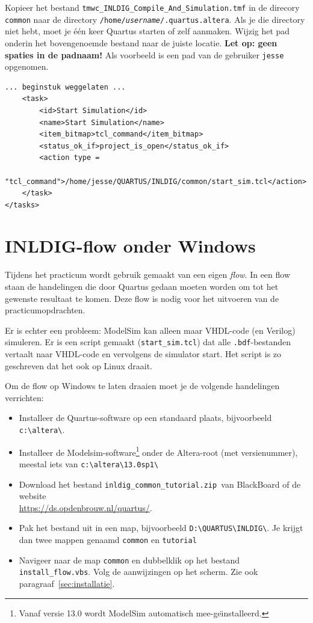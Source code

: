 \documentclass[a4paper,12pt,fleqn,twoside]{book}
\newcommand{\naam}[1]{\texttt{#1}}
\begin{document}
Kopieer het bestand \lstinline|tmwc_INLDIG_Compile_And_Simulation.tmf| in de
direcory \naam{common} naar de directory
\naam{/home/\textsl{username}/.quartus.altera}.
Als je die directory niet hebt, moet je \'{e}\'{e}n keer Quartus starten of
zelf aanmaken. Wijzig het pad onderin het bovengenoemde bestand naar de
juiste locatie. \textbf{Let op: geen spaties in de padnaam!} Als
voorbeeld is een pad van de gebruiker \naam{jesse} opgenomen. 

\bigskip
\begin{lstlisting}[numbers=none]
... beginstuk weggelaten ...
    <task> 
        <id>Start Simulation</id> 
        <name>Start Simulation</name> 
        <item_bitmap>tcl_command</item_bitmap> 
        <status_ok_if>project_is_open</status_ok_if> 
        <action type =
            "tcl_command">/home/jesse/QUARTUS/INLDIG/common/start_sim.tcl</action> 
    </task> 
</tasks> 
\end{lstlisting}



\chapter{INLDIG-flow onder Windows}
\label{chap:inldigflowonderwindows}
Tijdens het practicum wordt gebruik gemaakt van een eigen \textsl{flow}.
In een flow staan de handelingen die door Quartus gedaan moeten worden om
tot het gewenste resultaat te komen. Deze flow is nodig voor het uitvoeren
van de practicumopdrachten. 

Er is echter een probleem: ModelSim kan alleen maar VHDL-code (en Verilog)
simuleren. Er is een script gemaakt (\lstinline|start_sim.tcl|) dat alle
\naam{.bdf}-bestanden vertaalt naar VHDL-code en vervolgens de simulator
start. Het script is zo geschreven dat het ook op Linux draait.
 
Om de flow op Windows te laten draaien moet je de volgende handelingen
verrichten:

\begin{itemize}\itemsep-1pt
\item Installeer de Quartus-software op een standaard plaats, bijvoorbeeld
      \lstinline|c:\altera\|.
\item Installeer de Modelsim-software\footnote{Vanaf versie 13.0 wordt
      ModelSim automatisch mee-ge\"{\i}nstalleerd.} onder de Altera-root
      (met versienummer), meestal iets van \lstinline|c:\altera\13.0sp1\| 
\item Download het bestand \lstinline|inldig_common_tutorial.zip |van
      BlackBoard of de website\\ \url{https://ds.opdenbrouw.nl/quartus/}. 
\item Pak het bestand uit in een map, bijvoorbeeld
      \lstinline|D:\QUARTUS\INLDIG\|. Je krijgt dan twee mappen genaamd
      \lstinline|common| en \lstinline|tutorial|
\item Navigeer naar de map \lstinline|common| en dubbelklik op het bestand
      \lstinline|install_flow.vbs|. Volg de aanwijzingen op het scherm. Zie
      ook paragraaf~\ref{sec:installatie}.
\end{itemize}
\end{document}
